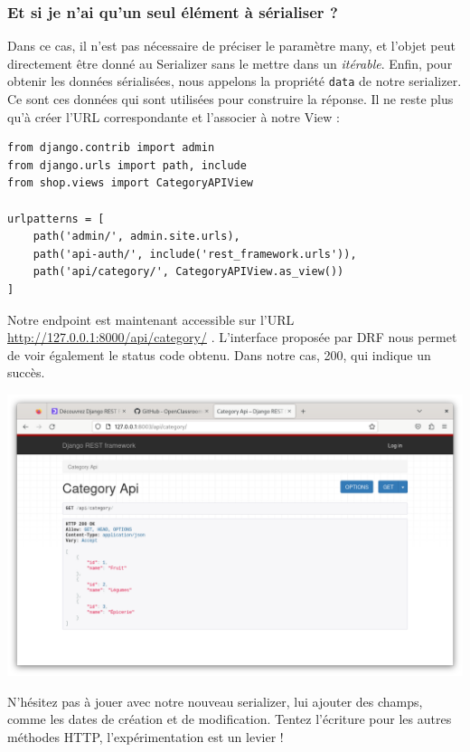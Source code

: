 \subsubsection*{Et si je n’ai qu’un seul élément à sérialiser ?}
Dans ce cas, il n’est pas nécessaire de préciser le paramètre  {\color{monOrange}many}, et l’objet peut directement être donné au {\color{monOrange}Serializer} sans le mettre dans un {\em itérable}. Enfin, pour obtenir les données sérialisées, nous appelons la propriété  {\tt data}  de notre serializer. Ce sont ces données qui sont utilisées pour construire la réponse. Il ne reste plus qu’à créer l’{\color{monOrange}URL} correspondante et l’associer à notre {\color{monOrange}View} :
\begin{verbatim}
from django.contrib import admin
from django.urls import path, include
from shop.views import CategoryAPIView
 
urlpatterns = [
    path('admin/', admin.site.urls),
    path('api-auth/', include('rest_framework.urls')),
    path('api/category/', CategoryAPIView.as_view())
]
\end{verbatim}
Notre endpoint est maintenant accessible sur l’URL \url{http://127.0.0.1:8000/api/category/} . L’interface proposée par {\color{monOrange}DRF} nous permet de voir également le status code obtenu. Dans notre cas, 200, qui indique un succès. 
\begin{center}
\includegraphics[width=15cm]{images/image05.png}
\end{center}

N’hésitez pas à jouer avec notre nouveau serializer, lui ajouter des champs, comme les dates de création et de modification. Tentez l’écriture pour les autres méthodes HTTP, l’expérimentation est un levier !

